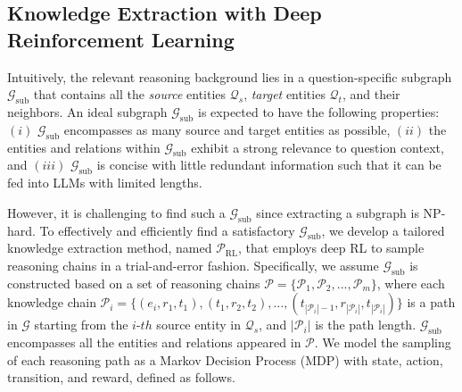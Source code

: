 \documentclass{article}
\theoremstyle{boldremark}
\begin{document}
\subsection{Knowledge Extraction with Deep Reinforcement Learning}
Intuitively, the relevant reasoning background lies in a question-specific subgraph $\mathcal{G}_{\text{sub}}$ that contains all the \textit{source} entities $\mathcal{Q}_s$, \textit{target} entities $\mathcal{Q}_t$, and their neighbors. An ideal subgraph $\mathcal{G}_{\text{sub}}$ is expected to have the following properties: \((i)\) $\mathcal{G}_{\text{sub}}$ encompasses as many source and target entities as possible, \((ii)\) the entities and relations within $\mathcal{G}_{\text{sub}}$ exhibit a strong relevance to question context, and \((iii)\) $\mathcal{G}_{\text{sub}}$ is concise with little redundant information such that it can be fed into LLMs with limited lengths.

However, it is challenging to find such a $\mathcal{G}_{\text{sub}}$ since extracting a subgraph is NP-hard. To effectively and efficiently find a satisfactory $\mathcal{G}_{\text{sub}}$, we develop a tailored knowledge extraction method, named $\mathcal{P}_\text{RL}$, that employs deep RL to sample reasoning chains in a trial-and-error fashion. Specifically, we assume $\mathcal{G}_{\text{sub}}$ is constructed based on a set of reasoning chains $\mathcal{P} = \{\mathcal{P}_1, \mathcal{P}_2, ..., \mathcal{P}_m\}$, where each knowledge chain $\mathcal{P}_i = \{(e_i, r_1, t_1), (t_1, r_2, t_2), ..., (t_{|\mathcal{P}_i|-1}, r_{|\mathcal{P}_i|}, t_{|\mathcal{P}_i|})\}$ is a path in $\mathcal{G}$ starting from the $i$-$th$ source entity in $\mathcal{Q}_s$, and $|\mathcal{P}_i|$ is the path length. $\mathcal{G}_{\text{sub}}$ encompasses all the entities and relations appeared in $\mathcal{P}$. We model the sampling of each reasoning path as a Markov Decision Process (MDP) with state, action, transition, and reward, defined as follows.
\end{document}
